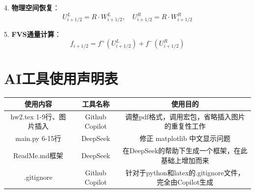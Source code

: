 \documentclass[UTF8]{ctexart}
\begin{document}
4. \textbf{物理空间恢复}：
   \begin{equation}
   U_{i+1/2}^L = R \cdot W_{i+1/2}^L, \quad U_{i+1/2}^R = R \cdot W_{i+1/2}^R
   \end{equation}

5. \textbf{FVS通量计算}：
   \begin{equation}
   f_{i+1/2} = f^+(U_{i+1/2}^L) + f^-(U_{i+1/2}^R)
   \end{equation}



\newpage
\appendix
\section*{AI工具使用声明表}
\begin{table}[H]
    \centering
    \begin{tabular}{c|c|c}
        \hline
        使用内容 & 工具名称 & 使用目的 \\ \hline
        hw2.tex 1-9行、图片插入 & Github Copilot & 调整pdf格式，调用宏包，省略插入图片的重复性工作 \\ 
        main.py 6-15行 & DeepSeek & 修正 matplotlib 中文显示问题 \\ 
        ReadMe.md框架 & DeepSeek & 在DeepSeek的帮助下生成一个框架，在此基础上增加而来 \\
        .gitignore & Github Copilot & 针对于python和latex的.gitignore文件，完全由Copilot生成  
    \end{tabular}
    \label{tab:AI_tools}
\end{table}


\newpage
\section*{}
\end{document}
